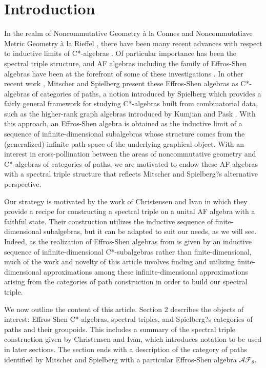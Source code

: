\documentclass[12pt]{amsart}
\theoremstyle{plain} %
\theoremstyle{definition} %
\begin{document}
\section{Introduction}

In the realm of Noncommutative Geometry \`a la Connes \cite{Con94} and Noncommutatiave  Metric Geometry \`a la Rieffel \cite{Rie04}, there have been many recent advances with respect to inductive limits of C*-algebras \cite{FLLP24, FLP22, BCFL23, FRG19, CI06, AAAKM23}. Of particular importance has been the spectral triple structure, and AF algebras including the family of Effros-Shen algebras \cite{ES80} have been at the forefront of some of these investigations \cite{CI06, AL15, AAAKM23}. In other recent work \cite{MS22}, Mitscher and Spielberg present these Effros-Shen algebras as C*-algebras of categories of paths, a notion introduced by Spielberg
which provides a fairly general framework for studying C*-algebras built from combinatorial
data, such as the higher-rank graph algebras introduced by Kumjian and
Pask   \cite{KP00, Spi14}. With this approach, an Effros-Shen algebra is obtained as the inductive
limit of a sequence of infinite-dimensional subalgebras whose structure comes
from the (generalized) infinite path space of the underlying graphical object. 
With an interest in cross-pollination between the areas of
noncommutative  geometry  and    C*-algebras of categories of paths, we are
motivated to endow these AF algebras with a spectral triple structure that reflects
Mitscher and Spielberg?s alternative perspective.


Our strategy is motivated by the work of  Christensen and Ivan \cite{CI06} in which they provide a recipe for constructing a
spectral triple on a unital AF algebra with a faithful state. Their construction
utilizes the inductive sequence of finite-dimensional subalgebras,  but it
can be adapted to suit our needs, as we will see. Indeed, as the realization of Effros-Shen algebras from \cite{MS22} is given by an inductive sequence of infinite-dimensional C*-subalgebras rather than finite-di\-men\-sional, much of the work and novelty of this article involves finding and utilizing finite-di\-mensional approximations among these infinite-dimensional approximations arising from the categories of path construction in order to build our spectral triple.

We now outline the content of this article. Section 2 describes the objects of
interest: Effros-Shen C*-algebras, spectral triples, and Spielberg?s categories of paths
and their groupoids. This includes a summary of the spectral triple construction
given by Christensen and Ivan, which introduces notation to be used in later sections.
The section ends with a description of the category of paths identified by Mitscher
and Spielberg with a particular Effros-Shen algebra $\mathcal{AF}_\theta$.
 
\end{document}
